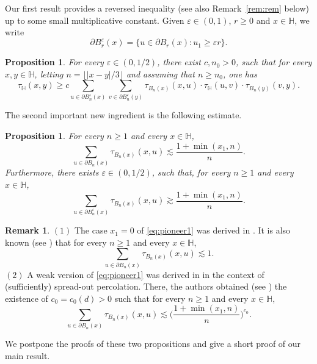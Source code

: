 \documentclass[11pt,a4paper]{article}
\numberwithin{equation}{section}
\theoremstyle{plain}
\newtheorem{Prop}[Thm]{Proposition}
\theoremstyle{definition}
\newtheorem{Rem}[Thm]{Remark}
\begin{document}
 Our first result provides a reversed inequality (see also Remark~\ref{rem:rem} below) up to some small multiplicative constant. Given $\varepsilon\in (0,1)$, $r\ge 0$ and $x\in \mathbb H$, we write 
\begin{equation}\label{Brepsilon}
\partial B_r^\varepsilon(x) = \{u\in \partial B_r(x) : u_1\ge \varepsilon r\}.
\end{equation}
\begin{Prop}\label{prop:reversedBK}
For every $\varepsilon \in (0,1/2)$, there exist $c,n_0>0$, such that for every $x,y \in \mathbb H$, letting $n  = \lfloor|x-y|/3\rfloor$ and assuming that $n\geq n_0$, one has 
\begin{equation}
\tau_{\mathbb H}(x,y) \ge c \sum_{ u\in \partial B_n^\varepsilon(x)} \sum_{v\in \partial B_n^\varepsilon(y)} \tau_{B_n(x)}(x,u) \cdot \tau_{\mathbb H}(u,v) \cdot \tau_{B_n(y)}(v,y).
\end{equation} 
\end{Prop} 
The second important new ingredient is the following estimate. 
\begin{Prop} \label{prop.phik}	
For every $n\geq 1$ and every $x\in \mathbb H$,  
	\begin{equation}\label{eq:pioneer1} 
	\sum_{u\in \partial B_n(x)} \tau_{B_n(x)}(x,u) \lesssim \frac {1+\min(x_1,n)} n. 
	\end{equation}
	Furthermore, there exists $\varepsilon\in (0,1/2)$, such that, for every $n\geq 1$ and every $x\in \mathbb H$, 
	\begin{equation}\label{eq:pioneer2}
	\sum_{u\in \partial B_n^\varepsilon(x)} \tau_{B_n(x)}(x,u) \gtrsim \frac {1+\min(x_1,n)} n. 
	\end{equation} 
\end{Prop} 
\begin{Rem} $(1)$ The case $x_1=0$ of \eqref{eq:pioneer1} was derived in \cite[Lemma~26]{ChatterjeeHanson}. It is also known (see \cite[Theorem~1.5]{vdHofstadSapoS14}) that for every $n\geq 1$ and every $x\in \mathbb H$, 
\begin{equation}
	\sum_{u\in \partial B_n(x)}\tau_{B_n(x)}(x,u)\lesssim 1.
\end{equation}
$(2)$ A weak version of \eqref{eq:pioneer1} was derived in \cite{DumPan24Perco} in the context of (sufficiently) spread-out percolation. There, the authors obtained (see \cite[Lemma~3.5]{DumPan24Perco}) the existence of $c_0=c_0(d)>0$ such that for every $n\geq 1$ and every $x\in \mathbb H$,
\begin{equation} 
	\sum_{u\in \partial B_n(x)} \tau_{B_n(x)}(x,u) \lesssim \Big(\frac {1+\min(x_1,n)} n\Big)^{c_0}. 
	\end{equation}
\end{Rem}
We postpone the proofs of these two propositions and give a short proof of our main result. 
\end{document}
